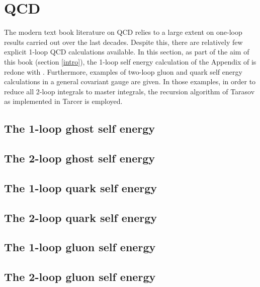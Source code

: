 \section{QCD}

The modern text book literature on QCD relies to a large extent on one-loop results
carried out over the last decades. Despite this, there are relatively few explicit 1-loop
QCD calculations available.
In this section, as part of the aim of this book (section \ref{intro}),
the 1-loop self energy calculation of the Appendix of \cite{Muta:vi} is
redone with \fc.
Furthermore, examples of two-loop gluon and quark self energy calculations in a general
covariant gauge are given. In those examples, in order to reduce all 2-loop integrals to
master integrals, the recursion algorithm of Tarasov \cite{Tarasov:1997kx} as implemented in
Tarcer \cite{Mertig:1998vk} is employed.

\subsection{The 1-loop ghost self energy }



\subsection{The 2-loop ghost self energy }

\subsection{The 1-loop quark self energy }



\subsection{The 2-loop quark self energy }

\subsection{The 1-loop gluon self energy }



\subsection{The 2-loop gluon self energy }

